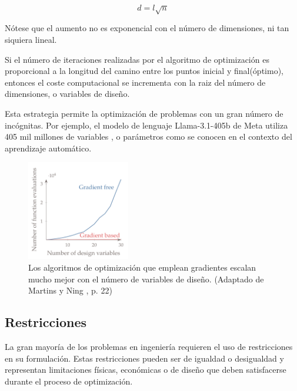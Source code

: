 \begin{equation}
	d = l\sqrt{n}
\end{equation}

Nótese que el aumento no es exponencial con el número de dimensiones, ni tan
siquiera lineal.

Si el número de iteraciones realizadas por el algoritmo de optimización es
proporcional a la longitud del camino entre los puntos inicial y final(óptimo),
entonces el coste computacional se incrementa con la raiz del número de
dimensiones, o variables de diseño.

Esta estrategia permite la optimización de problemas con un gran número de
incógnitas. Por ejemplo, el modelo de lenguaje Llama-3.1-405b de Meta utiliza
405 mil millones de variables \cite{dubey2024llama}, o parámetros como se
conocen en el contexto del aprendizaje automático.

\begin{figure}[h]
    \centering
    \includegraphics[width=0.4\textwidth]{./capitulos/metodologia/images/gradient_based_vs_gradient_free.png}
    \caption{Los algoritmos de optimización que emplean gradientes escalan mucho mejor con el número de variables de diseño. (Adaptado de Martins y Ning \cite{mdobook}, p. 22)}
    \label{fig:gradient_based_vs_gradient_free}
\end{figure}


\subsection{Restricciones}

La gran mayoría de los problemas en ingeniería requieren el uso de
restricciones en su formulación. Estas restricciones pueden ser de igualdad o
desigualdad y representan limitaciones físicas, económicas o de diseño que
deben satisfacerse durante el proceso de optimización.
